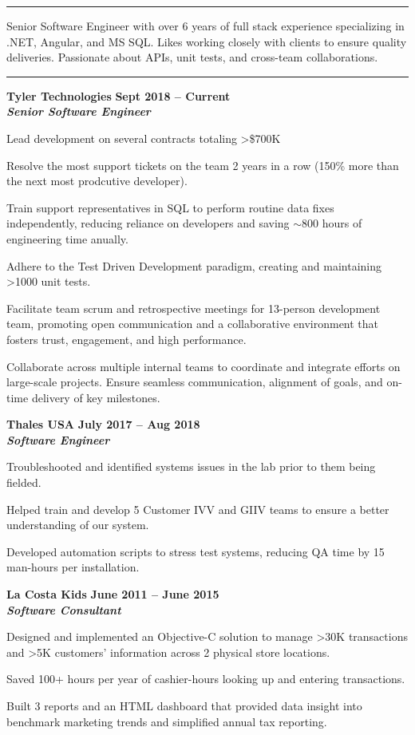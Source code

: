 \documentclass[10pt]{article}
\newcommand{\thing}[1][]{\item #1}
\newcommand{\sectionheader}[1]{
    \vspace{3pt}
    \StrSplit{#1}{3}{\firstpart}{\lastpart} %

    \makebox[0pt][l]{\textbf{\LARGE\firstpart\lastpart}}%
    \rule[-1ex]{\columnwidth}{.1pt}

}
\newcommand{\dates}[2]{
    \textbf{#1 -- #2}
}
\begin{document}
    \sectionheader{Professional Summary}
    Senior Software Engineer with over 6 years of full stack
        experience specializing in .NET, Angular, and MS SQL.
        Likes working closely with clients to ensure quality
        deliveries. Passionate about APIs, unit tests, and
        cross-team collaborations.
    
    \sectionheader{Experience}
    \textbf{\large Tyler Technologies} \hfill \dates{Sept 2018}{Current}\\
    \textit{\textbf{Senior Software Engineer}}
    \begin{things}
        \thing Lead development on several contracts totaling \textgreater\$700K
        \thing Resolve the most support tickets on the team 2 years in
                    a row (150\% more than the next most prodcutive developer).
        \thing Train support representatives in SQL to perform routine
                    data fixes independently, reducing reliance on developers
                    and saving $\sim$800 hours of engineering time anually.
        \thing Adhere to the Test Driven Development paradigm,
                    creating and maintaining \textgreater1000 unit tests.
        \thing Facilitate team scrum and retrospective meetings for 13-person
                development team, promoting open communication and a collaborative 
                environment that fosters trust, engagement, and high performance.
        \thing Collaborate across multiple internal teams to coordinate and integrate efforts
                    on large-scale projects. Ensure seamless communication, alignment of goals,
                    and on-time delivery of key milestones.
    \end{things}

    \textbf{\large Thales USA} \hfill \dates{July 2017}{Aug 2018}\\
    \textit{\textbf{Software Engineer}}
    \begin{things}
        \thing Troubleshooted and identified systems issues in 
                    the lab prior to them being fielded.
        \thing Helped train and develop 5 Customer IVV and 
                    GIIV teams to ensure a better understanding of our system.
        \thing Developed automation scripts to stress test systems, reducing
                    QA time by 15 man-hours per installation.
    \end{things}

    \textbf{\large La Costa Kids} \hfill \dates{June 2011}{June 2015}\\
    \textit{\textbf{Software Consultant}}
    \begin{things}
        \thing Designed and implemented an Objective-C solution to
                manage \textgreater30K transactions and \textgreater5K
                customers' information across 2 physical store locations.
        \thing Saved 100+ hours per year of cashier-hours looking
                up and entering transactions.
        \thing Built 3 reports and an HTML dashboard that provided data insight
                into benchmark marketing trends and simplified annual tax reporting.
    \end{things}
\end{document}
